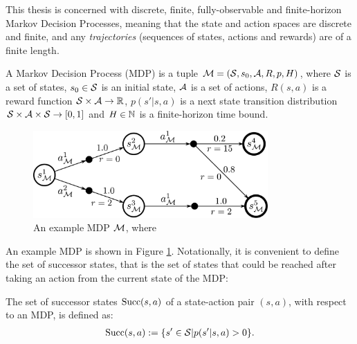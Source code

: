     This thesis is concerned with discrete, finite, fully-observable and finite-horizon Markov Decision Processes, meaning that the state and action spaces are discrete and finite, and any \textit{trajectories} (sequences of states, actions and rewards) are of a finite length. 

    \begin{defn}
        \label{def:mdp}
        A \textnormal{Markov Decision Process} (MDP) is a tuple $\mathcal{M}=(\mathcal{S},s_0,\mathcal{A},R,p,H)$, where $\mathcal{S}$ is a set of states, $s_0\in\mathcal{S}$ is an initial state, $\mathcal{A}$ is a set of actions, $R(s,a)$ is a reward function $\mathcal{S}\times \mathcal{A}\rightarrow \mathbb{R}$, $p(s' | s,a)$ is a next state transition distribution $\mathcal{S} \times \mathcal{A} \times \mathcal{S} \rightarrow [0,1]$ and $H\in\mathbb{N}$ is a finite-horizon time bound. 
    \end{defn}

    \begin{figure}
        \centering\includegraphics[width=0.8\textwidth]{figures/ch2/example_mdp.pdf} 
        \caption[An example MDP $\cl{M}$.]{An example MDP $\cl{M}$, where }
        \label{fig:mdp_eg}
    \end{figure}

    An example MDP is shown in Figure \ref{fig:mdp_eg}. Notationally, it is convenient to define the set of successor states, that is the set of states that could be reached after taking an action from the current state of the MDP:
    \begin{defn}
        \label{def:succ}
        The set of \textnormal{successor states} ${\textnormal{Succ}(s,a)}$ of a state-action pair $(s,a)$, with respect to an MDP, is defined as: 
        \begin{align}
            {\textnormal{Succ}(s,a)}:=\{s'\in\mathcal{S}|p(s'|s,a)>0\}. \label{eq:succ_def}
        \end{align}
    \end{defn}

